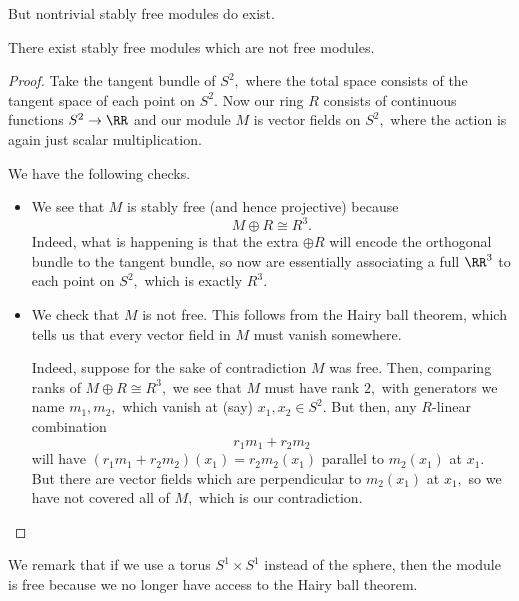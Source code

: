 But nontrivial stably free modules do exist.
\begin{proposition}
	There exist stably free modules which are not free modules.
\end{proposition}
\begin{proof}
	Take the tangent bundle of $S^2,$ where the total space consists of the tangent space of each point on $S^2.$ Now our ring $R$ consists of continuous functions $S^2\to\RR$ and our module $M$ is vector fields on $S^2,$ where the action is again just scalar multiplication.
	
	We have the following checks.
	\begin{itemize}
		\item We see that $M$ is stably free (and hence projective) because
		\[M\oplus R\cong R^3.\]
		Indeed, what is happening is that the extra $\oplus R$ will encode the orthogonal bundle to the tangent bundle, so now are essentially associating a full $\RR^3$ to each point on $S^2,$ which is exactly $R^3.$
		\item We check that $M$ is not free. This follows from the Hairy ball theorem, which tells us that every vector field in $M$ must vanish somewhere.
		
		Indeed, suppose for the sake of contradiction $M$ was free. Then, comparing ranks of $M\oplus R\cong R^3,$ we see that $M$ must have rank $2,$ with generators we name $m_1,m_2,$ which vanish at (say) $x_1,x_2\in S^2.$ But then, any $R$-linear combination
		\[r_1m_1+r_2m_2\]
		will have $(r_1m_1+r_2m_2)(x_1)=r_2m_2(x_1)$ parallel to $m_2(x_1)$ at $x_1.$ But there are vector fields which are perpendicular to $m_2(x_1)$ at $x_1,$ so we have not covered all of $M,$ which is our contradiction.
		\qedhere
	\end{itemize}
\end{proof}
We remark that if we use a torus $S^1\times S^1$ instead of the sphere, then the module is free because we no longer have access to the Hairy ball theorem.